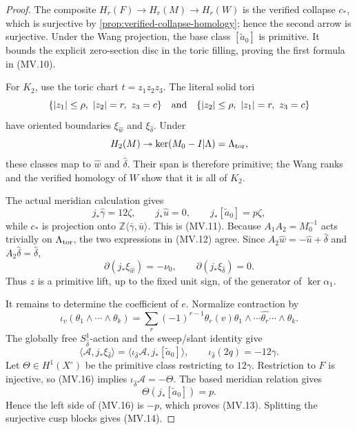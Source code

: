 \begin{proof}
The composite $H_r(F)\to H_r(M)\to H_r(W)$ is the verified collapse $c_*$,
which is surjective by \cref{prop:verified-collapse-homology}; hence the
second arrow is surjective.  Under the Wang projection, the base class
$[\widetilde a_0]$ is primitive.  It bounds the explicit zero-section disc
in the toric filling, proving the first formula in (MV.10).

For $K_2$, use the toric chart $t=z_1z_2z_3$.  The literal solid tori
\[
 \{|z_1|\leq\rho,\ |z_2|=r,\ z_3=c\}
 \quad\hbox{and}\quad
 \{|z_2|\leq\rho,\ |z_1|=r,\ z_3=c\}
\]
have oriented boundaries $\xi_{\widehat w}$ and
$\xi_{\widehat\delta}$.  Under
\[
 H_2(M)\twoheadrightarrow
 \ker(M_0-I|\Lambda)=\Lambda_{\rm tor},
\]
these classes map to $\widehat w$ and $\widehat\delta$.  Their span is
therefore primitive; the Wang ranks and the verified homology of $W$ show
that it is all of $K_2$.

The actual meridian calculation gives
\[
 j_*\widehat\gamma=12\zeta,
 \qquad j_*\widehat u=0,
 \qquad j_*[\widetilde a_0]=p\zeta,
\]
while $c_*$ is projection onto
$\mathbb Z\langle\bar\gamma,\bar u\rangle$.  This is (MV.11).
Because $A_1A_2=M_0^{-1}$ acts trivially on $\Lambda_{\rm tor}$, the two
expressions in (MV.12) agree.  Since
$A_2\widehat w=-\widehat u+\widehat\delta$ and
$A_2\widehat\delta=\widehat\delta$,
\[
 \partial(j_*\xi_{\widehat w})=-\nu_0,
 \qquad \partial(j_*\xi_{\widehat\delta})=0.
\tag{MV.15}
\]
Thus $z$ is a primitive lift, up to the fixed unit sign, of the generator of
$\ker\alpha_1$.

It remains to determine the coefficient of $e$.  Normalize contraction by
\[
 \iota_v(\theta_1\wedge\cdots\wedge\theta_k)
 =\sum_r(-1)^{r-1}\theta_r(v)
   \theta_1\wedge\cdots\widehat{\theta_r}\cdots\wedge\theta_k.
\]
The globally free $S^1_{\widehat\delta}$-action and the sweep/slant identity
give
\[
 \langle\mathcal A,j_*\xi_{\widehat\delta}\rangle
 =\langle\iota_{\widehat\delta}\mathcal A,
          j_*[\widetilde a_0]\rangle,
 \qquad
 \iota_{\widehat\delta}(2q)=-12\gamma.
\tag{MV.16}
\]
Let $\Theta\in H^1(X^\circ)$ be the primitive class restricting to
$12\gamma$.  Restriction to $F$ is injective, so (MV.16) implies
$\iota_{\widehat\delta}\mathcal A=-\Theta$.  The based meridian relation
gives
\[
 \Theta(j_*[\widetilde a_0])=p.
\]
Hence the left side of (MV.16) is $-p$, which proves (MV.13).  Splitting the
surjective cusp blocks gives (MV.14).
\end{proof}

